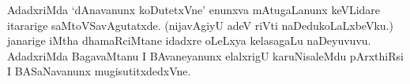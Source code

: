 AdadxriMda `dAnavanunx koDutetxVne' enunxva mAtugaLanunx keVLidare itararige saMtoVSavAgutatxde.‌ (nijavAgiyU adeV riVti naDedukoLaLxbeVku.) janarige iMtha dhamaRciMtane idadxre oLeLxya kelasagaLu naDeyuvuvu. AdadxriMda BagavaMtanu I BAvaneyanunx elalxrigU karuNisaleMdu pArxthiRsi I BASaNavanunx mugisutitxdedxVne.
















































































